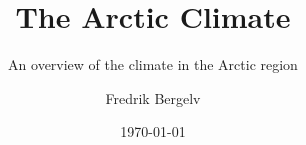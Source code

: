 
\title{The Arctic Climate}

\subtitle{An overview of the climate in the Arctic region}

\author{Fredrik Bergelv}

\date{\today}

\newcommand{\IncludeBib}{y} 